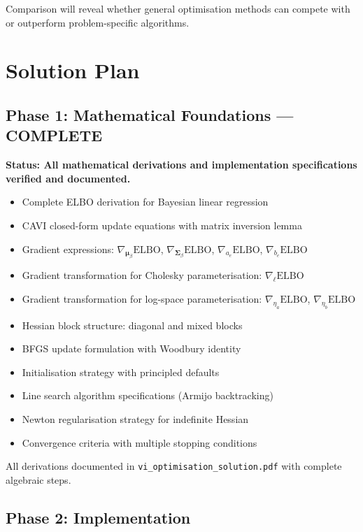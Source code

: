 \documentclass[11pt]{article}
\newcommand{\ELBO}{\text{ELBO}}
\begin{document}
Comparison will reveal whether general optimisation methods can compete with or outperform problem-specific algorithms.

\newpage
\section*{Solution Plan}

\subsection*{Phase 1: Mathematical Foundations — COMPLETE}

\textbf{Status: All mathematical derivations and implementation specifications verified and documented.}

\begin{itemize}
\item[\checkmark] Complete ELBO derivation for Bayesian linear regression
\item[\checkmark] CAVI closed-form update equations with matrix inversion lemma
\item[\checkmark] Gradient expressions: $\nabla_{\bm{\mu}_\beta} \ELBO$, $\nabla_{\bm{\Sigma}_\beta} \ELBO$, $\nabla_{a_e} \ELBO$, $\nabla_{b_e} \ELBO$
\item[\checkmark] Gradient transformation for Cholesky parameterisation: $\nabla_{\bm{\ell}} \ELBO$
\item[\checkmark] Gradient transformation for log-space parameterisation: $\nabla_{\eta_a} \ELBO$, $\nabla_{\eta_b} \ELBO$
\item[\checkmark] Hessian block structure: diagonal and mixed blocks
\item[\checkmark] BFGS update formulation with Woodbury identity
\item[\checkmark] Initialisation strategy with principled defaults
\item[\checkmark] Line search algorithm specifications (Armijo backtracking)
\item[\checkmark] Newton regularisation strategy for indefinite Hessian
\item[\checkmark] Convergence criteria with multiple stopping conditions
\end{itemize}

All derivations documented in \texttt{vi\_optimisation\_solution.pdf} with complete algebraic steps.

\subsection*{Phase 2: Implementation}
\end{document}
